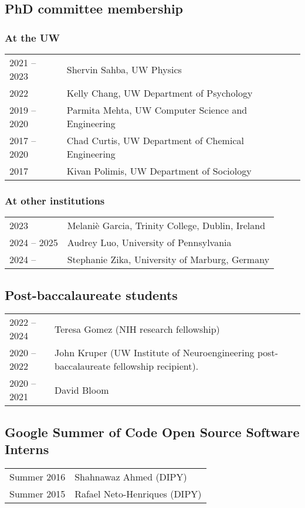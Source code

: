 \documentclass[11pt,fullpage]{article}
\begin{document}
\subsection*{PhD committee membership}

\subsubsection*{At the UW}
\begin{tabular}{p{}p{}}
2021 -- 2023 & Shervin Sahba, UW Physics \\
2022 & Kelly Chang, UW Department of Psychology\\
2019 -- 2020 & Parmita Mehta, UW Computer Science and Engineering\\
2017 -- 2020 & Chad Curtis, UW Department of Chemical Engineering\\
2017 & Kivan Polimis, UW Department of Sociology
\end{tabular}
\subsubsection*{At other institutions}
\begin{tabular}{p{}p{}}
2023 & Melani\`{e} Garcia, Trinity College, Dublin, Ireland\\
2024 -- 2025 & Audrey Luo, University of Pennsylvania\\
2024 -- & Stephanie Zika, University of Marburg, Germany\\
\end{tabular}

\subsection*{Post-baccalaureate students}
\begin{tabular}{p{}p{}}
2022 -- 2024 & Teresa Gomez (NIH research fellowship) \\
2020 -- 2022 & John Kruper (UW Institute of Neuroengineering post-baccalaureate fellowship recipient).\\
2020 -- 2021 & David Bloom\\
\end{tabular}

\subsection*{Google Summer of Code Open Source Software Interns}
\begin{tabular}{p{}p{}}
Summer 2016 & Shahnawaz Ahmed (DIPY)\\
Summer 2015 & Rafael Neto-Henriques (DIPY)\\
\end{tabular}
\end{document}
